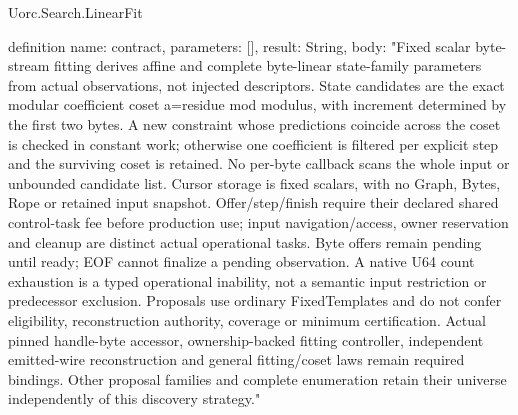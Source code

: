 \begin{lexlean}{Uorc.Search.LinearFit}
\begin{semanticmodule}
definition{
  name: contract,
  parameters: [],
  result: String,
  body: "Fixed scalar byte-stream fitting derives affine and complete byte-linear state-family parameters from actual observations, not injected descriptors. State candidates are the exact modular coefficient coset a=residue mod modulus, with increment determined by the first two bytes. A new constraint whose predictions coincide across the coset is checked in constant work; otherwise one coefficient is filtered per explicit step and the surviving coset is retained. No per-byte callback scans the whole input or unbounded candidate list. Cursor storage is fixed scalars, with no Graph, Bytes, Rope or retained input snapshot. Offer/step/finish require their declared shared control-task fee before production use; input navigation/access, owner reservation and cleanup are distinct actual operational tasks. Byte offers remain pending until ready; EOF cannot finalize a pending observation. A native U64 count exhaustion is a typed operational inability, not a semantic input restriction or predecessor exclusion. Proposals use ordinary FixedTemplates and do not confer eligibility, reconstruction authority, coverage or minimum certification. Actual pinned handle-byte accessor, ownership-backed fitting controller, independent emitted-wire reconstruction and general fitting/coset laws remain required bindings. Other proposal families and complete enumeration retain their universe independently of this discovery strategy."
}
\end{semanticmodule}
\end{lexlean}

